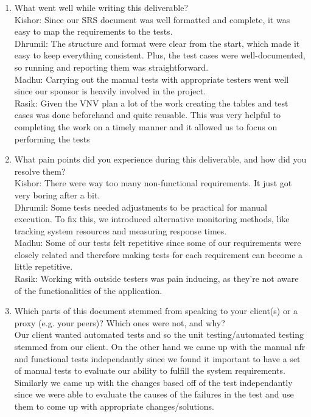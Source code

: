 \documentclass[12pt, titlepage]{article}
\begin{document}
\begin{enumerate}
  \item What went well while writing this deliverable? \\
   Kishor: Since our SRS document was well formatted and complete, it
   was easy to map the requirements to the tests.\\
   Dhrumil: The structure and format were clear from the start, which made it easy to keep everything consistent. Plus, the test cases were well-documented, so running and reporting them was straightforward. \\
   Madhu: Carrying out the manual tests with appropriate testers went well since our sponsor is heavily involved in the project. \\ 
   Rasik: Given the VNV plan a lot of the work creating the tables and test cases was done beforehand and quite reusable. This was very helpful to completing the work on a timely manner and it allowed us to focus on performing the tests\\
  \item What pain points did you experience during this deliverable, and how
    did you resolve them? \\
    Kishor: There were way too many non-functional requirements. It just got very boring after a bit.\\
    Dhrumil: Some tests needed adjustments to be practical for manual execution. To fix this, we introduced alternative monitoring methods, like tracking system resources and measuring response times. \\
    Madhu: Some of our tests felt repetitive since some of our requirements were closely related and therefore making tests for each requirement can become a little repetitive. \\
    Rasik: Working with outside testers was pain inducing, as they're not aware of the functionalities of the application. \\ 
  \item Which parts of this document stemmed from speaking to your client(s) or
  a proxy (e.g. your peers)? Which ones were not, and why?
  \\
  Our client wanted automated tests and so the unit testing/automated testing stemmed from our client. On the other hand we came up with the manual nfr and functional tests independantly since we found it important to have a set of manual tests to evaluate our ability to fulfill the system requirements. Similarly we came up with the changes based off of the test independantly since we were able to evaluate the causes of the failures in the test and use them to come up with appropriate changes/solutions. 

\end{enumerate}
\end{document}
